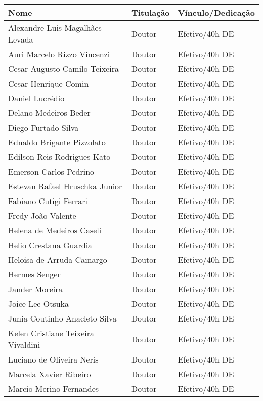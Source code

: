 \begin{table}[!htb]
\centering
\begin{tabular}{|l|l|l|} \hline
\textbf{Nome} & \textbf{Titulação} & \textbf{Vínculo/Dedicação} \\ \hline
Alexandre Luis Magalhães Levada & Doutor & Efetivo/40h DE \\ \hline
Auri Marcelo Rizzo Vincenzi & Doutor & Efetivo/40h DE \\ \hline
Cesar Augusto Camilo Teixeira & Doutor & Efetivo/40h DE \\ \hline
Cesar Henrique Comin & Doutor & Efetivo/40h DE \\ \hline
Daniel Lucrédio & Doutor & Efetivo/40h DE \\ \hline
Delano Medeiros Beder &Doutor & Efetivo/40h DE \\ \hline
Diego Furtado Silva & Doutor & Efetivo/40h DE \\ \hline
Ednaldo Brigante Pizzolato & Doutor & Efetivo/40h DE \\ \hline
Edílson Reis Rodrigues Kato & Doutor & Efetivo/40h DE \\ \hline
Emerson Carlos Pedrino & Doutor & Efetivo/40h DE \\ \hline
Estevan Rafael Hruschka Junior & Doutor & Efetivo/40h DE \\ \hline
Fabiano Cutigi Ferrari & Doutor & Efetivo/40h DE \\ \hline
Fredy João Valente & Doutor & Efetivo/40h DE \\ \hline
Helena de Medeiros Caseli & Doutor & Efetivo/40h DE \\ \hline
Helio Crestana Guardia & Doutor & Efetivo/40h DE \\ \hline
Heloisa de Arruda Camargo & Doutor & Efetivo/40h DE \\ \hline
Hermes Senger & Doutor & Efetivo/40h DE \\ \hline
Jander Moreira & Doutor & Efetivo/40h DE \\ \hline
Joice Lee Otsuka & Doutor & Efetivo/40h DE \\ \hline
Junia Coutinho Anacleto Silva & Doutor & Efetivo/40h DE \\ \hline
Kelen Cristiane Teixeira Vivaldini & Doutor & Efetivo/40h DE \\ \hline
Luciano de Oliveira Neris & Doutor & Efetivo/40h DE \\ \hline
Marcela Xavier Ribeiro & Doutor & Efetivo/40h DE \\ \hline
Marcio Merino Fernandes & Doutor & Efetivo/40h DE \\ \hline

\end{tabular}
\end{table}
